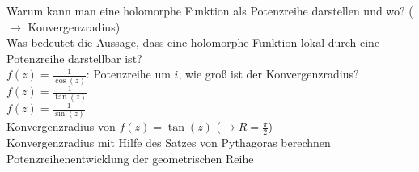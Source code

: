 \documentclass[11pt]{article}
\begin{document}
\begin{itemize}
\quad Warum kann man eine holomorphe Funktion als Potenzreihe darstellen und wo? ($\rightarrow$ Konvergenzradius) \\
\quad Was bedeutet die Aussage, dass eine holomorphe Funktion lokal durch eine Potenzreihe darstellbar ist? \\
\quad $f(z) = \frac{1}{\cos(z)}$: Potenzreihe um $i$, wie groß ist der Konvergenzradius? \\
\quad $f(z) = \frac{1}{\tan(z)}$ \\
\quad $f(z) = \frac{1}{\sin(z)}$ \\
\quad Konvergenzradius von $f(z) = \tan(z)$ ($\rightarrow R=\frac{\pi}{2}$) \\
\quad Konvergenzradius mit Hilfe des Satzes von Pythagoras berechnen \\
\quad Potenzreihenentwicklung der geometrischen Reihe
\end{itemize}
\end{document}
